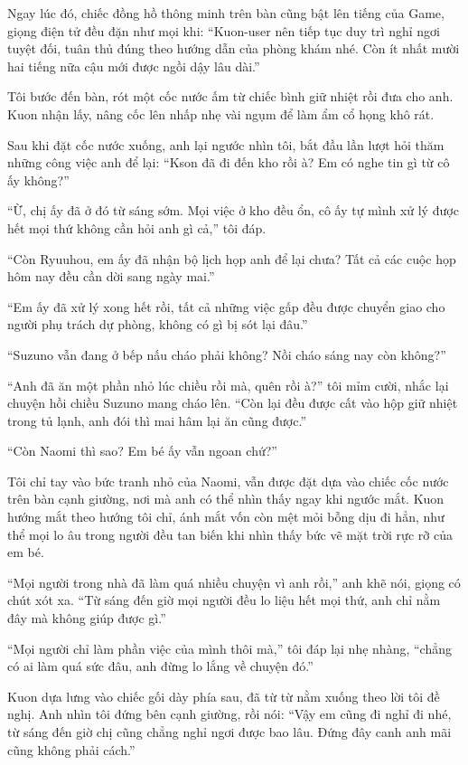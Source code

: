 \documentclass[../main.tex]{subfiles}
\begin{document}
Ngay lúc đó, chiếc đồng hồ thông minh trên bàn cũng bật lên tiếng của Game, giọng điện tử đều đặn như mọi khi: ``Kuon-user nên tiếp tục duy trì nghỉ ngơi tuyệt đối, tuân thủ đúng theo hướng dẫn của phòng khám nhé. Còn ít nhất mười hai tiếng nữa cậu mới được ngồi dậy lâu dài.''

Tôi bước đến bàn, rót một cốc nước ấm từ chiếc bình giữ nhiệt rồi đưa cho anh. Kuon nhận lấy, nâng cốc lên nhấp nhẹ vài ngụm để làm ẩm cổ họng khô rát.

Sau khi đặt cốc nước xuống, anh lại ngước nhìn tôi, bắt đầu lần lượt hỏi thăm những công việc anh để lại: ``Kson đã đi đến kho rồi à? Em có nghe tin gì từ cô ấy không?''

``Ừ, chị ấy đã ở đó từ sáng sớm. Mọi việc ở kho đều ổn, cô ấy tự mình xử lý được hết mọi thứ không cần hỏi anh gì cả,'' tôi đáp.

``Còn Ryuuhou, em ấy đã nhận bộ lịch họp anh để lại chưa? Tất cả các cuộc họp hôm nay đều cần dời sang ngày mai.''

``Em ấy đã xử lý xong hết rồi, tất cả những việc gấp đều được chuyển giao cho người phụ trách dự phòng, không có gì bị sót lại đâu.''

``Suzuno vẫn đang ở bếp nấu cháo phải không? Nồi cháo sáng nay còn không?''

``Anh đã ăn một phần nhỏ lúc chiều rồi mà, quên rồi à?'' tôi mỉm cười, nhắc lại chuyện hồi chiều Suzuno mang cháo lên. ``Còn lại đều được cất vào hộp giữ nhiệt trong tủ lạnh, anh đói thì mai hâm lại ăn cũng được.''

``Còn Naomi thì sao? Em bé ấy vẫn ngoan chứ?''

Tôi chỉ tay vào bức tranh nhỏ của Naomi, vẫn được đặt dựa vào chiếc cốc nước trên bàn cạnh giường, nơi mà anh có thể nhìn thấy ngay khi ngước mắt. Kuon hướng mắt theo hướng tôi chỉ, ánh mắt vốn còn mệt mỏi bỗng dịu đi hẳn, như thể mọi lo âu trong người đều tan biến khi nhìn thấy bức vẽ mặt trời rực rỡ của em bé.

``Mọi người trong nhà đã làm quá nhiều chuyện vì anh rồi,'' anh khẽ nói, giọng có chút xót xa. ``Từ sáng đến giờ mọi người đều lo liệu hết mọi thứ, anh chỉ nằm đây mà không giúp được gì.''

``Mọi người chỉ làm phần việc của mình thôi mà,'' tôi đáp lại nhẹ nhàng, ``chẳng có ai làm quá sức đâu, anh đừng lo lắng về chuyện đó.''

Kuon dựa lưng vào chiếc gối dày phía sau, đã từ từ nằm xuống theo lời tôi đề nghị. Anh nhìn tôi đứng bên cạnh giường, rồi nói: ``Vậy em cũng đi nghỉ đi nhé, từ sáng đến giờ chị cũng chẳng nghỉ ngơi được bao lâu. Đứng đây canh anh mãi cũng không phải cách.''
\end{document}
